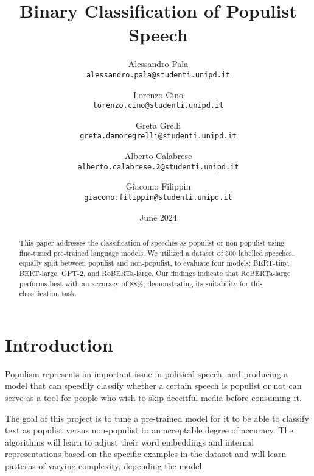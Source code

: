 \documentclass[11pt,twocolumn,letterpaper]{article}
\begin{document}
\title{\huge Binary Classification of Populist Speech}

\author{
    Alessandro Pala\\
    {\tt\small alessandro.pala@studenti.unipd.it}
    \and
    Lorenzo Cino\\
    {\tt\small lorenzo.cino@studenti.unipd.it}
    \and
    Greta Grelli\\
    {\tt\small greta.damoregrelli@studenti.unipd.it}
    \and
    Alberto Calabrese\\
    {\tt\small alberto.calabrese.2@studenti.unipd.it}
    \and
    Giacomo Filippin\\
    {\tt\small giacomo.filippin@studenti.unipd.it}
} \break

\date{June 2024}

\maketitle

\begin{abstract}
This paper addresses the classification of speeches as populist or non-populist using fine-tuned pre-trained language models. We utilized a dataset of 500 labelled speeches, equally split between populist and non-populist, to evaluate four models: BERT-tiny, BERT-large, GPT-2, and RoBERTa-large. Our findings indicate that RoBERTa-large performs best with an accuracy of 88\%, demonstrating its suitability for this classification task.
\end{abstract}


\section{Introduction}

Populism represents an important issue in political speech, and producing a model that can speedily classify whether a certain speech is populist or not can serve as a tool for people who wish to skip deceitful media before consuming it.

The goal of this project is to tune a pre-trained model for it to be able to classify text as populist versus non-populist to an acceptable degree of accuracy. The algorithms will learn to adjust their word embeddings and internal representations based on the specific examples in the dataset and will learn patterns of varying complexity, depending the model.
\end{document}
